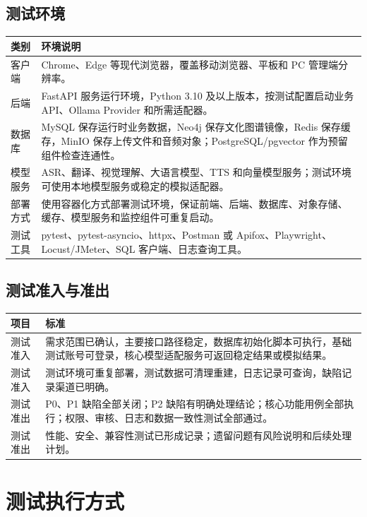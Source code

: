 \subsection{测试环境}

\begin{longtable}{p{3cm}p{10.4cm}}
\toprule
类别 & 环境说明 \\
\midrule
客户端 & Chrome、Edge 等现代浏览器，覆盖移动浏览器、平板和 PC 管理端分辨率。 \\
后端 & FastAPI 服务运行环境，Python 3.10 及以上版本，按测试配置启动业务 API、Ollama Provider 和所需适配器。 \\
数据库 & MySQL 保存运行时业务数据，Neo4j 保存文化图谱镜像，Redis 保存缓存，MinIO 保存上传文件和音频对象；PostgreSQL/pgvector 作为预留组件检查连通性。 \\
模型服务 & ASR、翻译、视觉理解、大语言模型、TTS 和向量模型服务；测试环境可使用本地模型服务或稳定的模拟适配器。 \\
部署方式 & 使用容器化方式部署测试环境，保证前端、后端、数据库、对象存储、缓存、模型服务和监控组件可重复启动。 \\
测试工具 & pytest、pytest-asyncio、httpx、Postman 或 Apifox、Playwright、Locust/JMeter、SQL 客户端、日志查询工具。 \\
\bottomrule
\end{longtable}

\subsection{测试准入与准出}

\begin{longtable}{p{3.2cm}p{10.2cm}}
\toprule
项目 & 标准 \\
\midrule
测试准入 & 需求范围已确认，主要接口路径稳定，数据库初始化脚本可执行，基础测试账号可登录，核心模型适配服务可返回稳定结果或模拟结果。 \\
测试准入 & 测试环境可重复部署，测试数据可清理重建，日志记录可查询，缺陷记录渠道已明确。 \\
测试准出 & P0、P1 缺陷全部关闭；P2 缺陷有明确处理结论；核心功能用例全部执行；权限、审核、日志和数据一致性测试全部通过。 \\
测试准出 & 性能、安全、兼容性测试已形成记录；遗留问题有风险说明和后续处理计划。 \\
\bottomrule
\end{longtable}

\section{测试执行方式}

